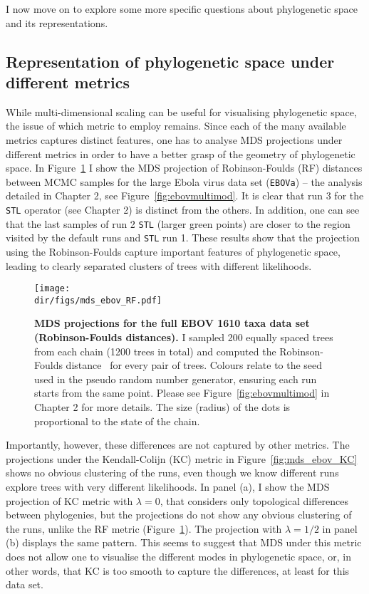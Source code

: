 I now move on to explore some more specific questions about phylogenetic space and its representations.

\subsection{Representation of phylogenetic space under different metrics}
\label{sec:representation}

While multi-dimensional scaling can be useful for visualising phylogenetic space, the issue of which metric to employ remains.
Since each of the many available metrics captures distinct features, one has to analyse MDS projections under different metrics in order to have a better grasp of the geometry of phylogenetic space.
In Figure~\ref{fig:mds_ebov_RF} I show the MDS projection of Robinson-Foulds (RF) distances between MCMC samples for the large Ebola virus data set (\verb|EBOVa|) -- the analysis detailed in Chapter 2, see Figure~\ref{fig:ebovmultimod}. 
It is clear that run 3 for the \verb|STL| operator (see Chapter 2) is distinct from the others. 
In addition, one can see that the last samples of run 2 \verb|STL| (larger green points) are closer to the region visited by the default runs and \verb|STL| run 1.
These results show that the projection using the Robinson-Foulds capture important features of phylogenetic space, leading to clearly separated clusters of trees with different likelihoods.

\begin{figure}[!ht]
\begin{center}
\texttt{[image: \\dir/figs/mds\_ebov\_RF.pdf]} 
\end{center}
 \caption[MDS projections for the full EBOV 1610 taxa data set (Robinson-Foulds distances).]{\textbf{MDS projections for the full EBOV 1610 taxa data set (Robinson-Foulds distances).}
 I sampled 200  equally spaced trees from each chain (1200 trees in total) and computed the Robinson-Foulds distance~\citep{Robinson1981} for every pair of trees.
 Colours relate to the seed used in the pseudo random number generator, ensuring each run starts from the same point. 
 Please see Figure~\ref{fig:ebovmultimod} in Chapter 2 for more details. 
 The size (radius) of the dots is proportional to the state of the chain.
 }
 \label{fig:mds_ebov_RF}
\end{figure}

Importantly, however, these differences are not captured by other metrics.
The projections under the Kendall-Colijn  (KC) metric in Figure~\ref{fig:mds_ebov_KC} shows no obvious clustering of the runs, even though we know different runs explore trees with very different likelihoods.
In panel (a), I show the MDS projection of KC metric  with $\lambda = 0$, that considers only topological differences between phylogenies, but the projections do not show any obvious clustering of the runs, unlike the RF metric (Figure~\ref{fig:mds_ebov_RF}).
The projection with $\lambda = 1/2$ in panel (b) displays the same pattern.
This seems to suggest that MDS under this metric does not allow one to visualise the different modes in phylogenetic space, or, in other words, that KC is too smooth to capture the differences, at least for this data set.

